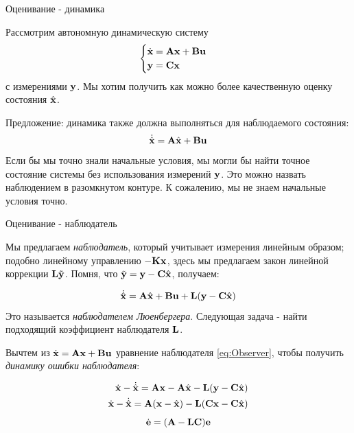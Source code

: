 \documentclass{beamer}
\begin{document}
\begin{frame}{Оценивание - динамика}
	\begin{flushleft}
		
		Рассмотрим автономную динамическую систему
		\begin{equation}
			\label{eq:LTI}
			\begin{cases}
				\dot {\mathbf{x}} = \mathbf{A} \mathbf{x} + \mathbf{B} \mathbf{u} \\
				\mathbf{y} = \mathbf{C} \mathbf{x}
			\end{cases}
		\end{equation}
		с измерениями $\mathbf{y}$. Мы хотим получить как можно более качественную оценку состояния $\hat{\mathbf{x}}$.
		
		\bigskip
		
		Предложение: динамика также должна выполняться для наблюдаемого состояния:
		\begin{equation}
			\dot{\hat{\mathbf{x}}} = \mathbf{A} \hat{\mathbf{x}} + \mathbf{B} \mathbf{u}
		\end{equation}
		Если бы мы точно знали начальные условия, мы могли бы найти точное состояние системы без использования измерений $\mathbf{y}$. Это можно назвать наблюдением в разомкнутом контуре. К сожалению, мы не знаем начальные условия точно.
		
	\end{flushleft}
\end{frame}

\begin{frame}{Оценивание - наблюдатель}
	\begin{flushleft}
		
		Мы предлагаем \emph{наблюдатель}, который учитывает измерения линейным образом; подобно линейному управлению $-\mathbf{K}\mathbf{x}$, здесь мы предлагаем закон линейной коррекции $\mathbf{L}\Tilde{\mathbf{y}}$. Помня, что $\Tilde{\mathbf{y}} = \mathbf{y} - \mathbf{C} \hat{\mathbf{x}}$, получаем:
		
		\begin{equation}
			\label{eq:Observer}
			\dot{\hat{\mathbf{x}}} = \mathbf{A} \hat{\mathbf{x}} + \mathbf{B} \mathbf{u} + \mathbf{L}(\mathbf{y} - \mathbf{C} \hat{\mathbf{x}})
		\end{equation}
		Это называется \emph{наблюдателем Люенбергера}. Следующая задача - найти подходящий коэффициент наблюдателя $ \mathbf{L}$.
		
		\bigskip
		
		Вычтем из $\dot {\mathbf{x}} = \mathbf{A} \mathbf{x} + \mathbf{B} \mathbf{u}$ уравнение наблюдателя \eqref{eq:Observer}, чтобы получить \emph{динамику ошибки наблюдателя}:
		
		\begin{align}
			\dot {\mathbf{x}} - \dot{\hat{\mathbf{x}}} = 
			\mathbf{A} \mathbf{x} - \mathbf{A} \hat{\mathbf{x}} - 
			\mathbf{L}(\mathbf y - \mathbf{C} \hat{\mathbf{x}})
			\\
			\dot {\mathbf{x}} - \dot{\hat{\mathbf{x}}}
			= 
			\mathbf{A} (\mathbf{x} - \hat{\mathbf{x}} ) - 
			\mathbf{L}(\mathbf{C} \mathbf{x} - \mathbf{C}\hat{\mathbf{x}} ) 
		\end{align}
		\begin{equation}
			\dot {\mathbf{e} }= (\mathbf{A} - \mathbf{L} \mathbf{C})\mathbf{e} 
		\end{equation}
		
	\end{flushleft}
\end{frame}
\end{document}

